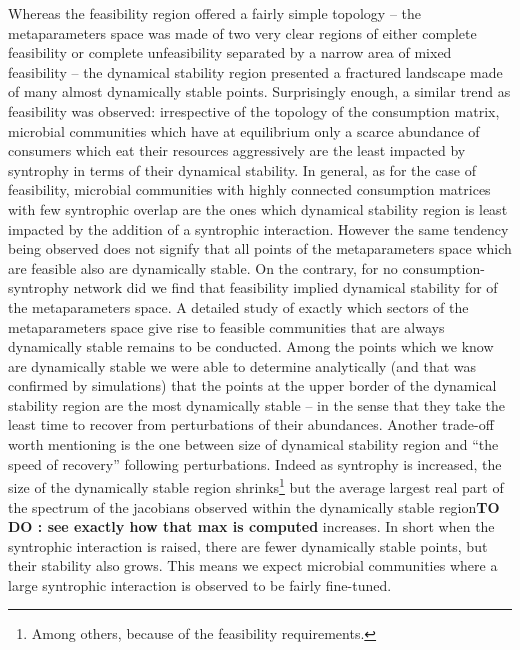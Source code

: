 \documentclass[12pt, titlepage]{report}
\begin{document}
Whereas the feasibility region offered a fairly simple topology -- the metaparameters space was made of two very clear regions of either complete feasibility or complete unfeasibility separated by a narrow area of mixed feasibility -- the dynamical stability region presented a fractured landscape made of many almost dynamically stable points.
Surprisingly enough, a similar trend as feasibility was observed: irrespective of the topology of the consumption matrix, microbial communities which have at equilibrium only a scarce abundance of consumers which eat their resources aggressively are the least impacted by syntrophy in terms of their dynamical stability. In general, as for the case of feasibility, microbial communities with highly connected consumption matrices with few syntrophic overlap are the ones which dynamical stability region is least impacted by the addition of a syntrophic interaction. However the same tendency being observed does not signify that all points of the metaparameters space which are feasible also are dynamically stable. On the contrary, for no consumption-syntrophy network did we find that feasibility implied dynamical stability for  of the metaparameters space. A detailed study of exactly which sectors of the metaparameters space give rise to feasible communities that are always dynamically stable remains to be conducted. Among the points which we know are dynamically stable we were able to determine analytically (and that was confirmed by simulations) that the points at the upper border of the dynamical stability region are the most dynamically stable -- in the sense that they take the least time to recover from perturbations of their abundances. Another trade-off worth mentioning is the one between size of dynamical stability region and ``the speed of recovery'' following perturbations. Indeed as syntrophy is increased, the size of the dynamically stable region shrinks\footnote{Among others, because of the feasibility requirements.} but the average largest real part of the spectrum of the jacobians observed within the dynamically stable region\textbf{TO DO : see exactly how that max is computed} increases. In short when the syntrophic interaction is raised, there are fewer dynamically stable points, but their stability also grows. This means we expect microbial communities where a large syntrophic interaction is observed to be fairly fine-tuned.
\end{document}
